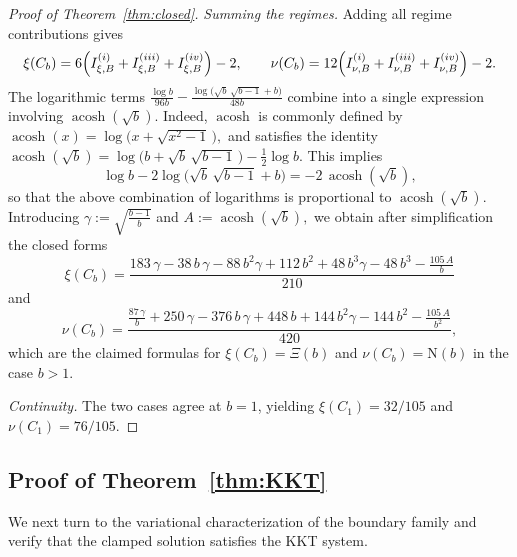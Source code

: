 \documentclass{article}
\DeclareMathOperator{\acosh}{acosh}
\newcommand{\1}{\mathds{1}}
\newcommand{\NN}{\mathrm{N}}
\begin{document}
\begin{proof}[Proof of Theorem~\ref{thm:closed}]
\smallskip
\noindent\emph{Summing the regimes.}
Adding all regime contributions gives
\[
\xi(C_b)
= 6\Bigl(I^{(i)}_{\xi,B}+I^{(iii)}_{\xi,B}+I^{(iv)}_{\xi,B}\Bigr)-2,
\qquad
\nu(C_b)
= 12\Bigl(I^{(i)}_{\nu,B}+I^{(iii)}_{\nu,B}+I^{(iv)}_{\nu,B}\Bigr)-2.
\]
The logarithmic terms
\(
\frac{\log b}{96b}
-\frac{\log\!\bigl(\sqrt b\,\sqrt{b-1}+b\bigr)}{48b}
\)
combine into a single expression involving  \(\acosh(\sqrt b)\).
Indeed, $\acosh$ is commonly defined by
\(
\acosh(x)=\log\!\bigl(x+\sqrt{x^2-1}\,\bigr),
\)
and satisfies the identity
\(
\acosh(\sqrt b)
=\log\!\bigl(b+\sqrt b\,\sqrt{b-1}\,\bigr)-\tfrac12\log b.
\)
This implies
\[
\log b-2\log\!\bigl(\sqrt b\,\sqrt{b-1}+b\bigr)
=-2\,\acosh(\sqrt b),
\]
so that the above combination of logarithms is proportional to \(\acosh(\sqrt b)\).
Introducing
\(
\gamma:=\sqrt{\frac{b-1}{\,b\,}}
\)
and
\(
A:=\acosh(\sqrt b),
\)
we obtain after simplification the closed forms
\[
\xi(C_b)
= \frac{
 183\,\gamma
 -38\,b\,\gamma
 -88\,b^{2}\gamma
 +112\,b^{2}
 +48\,b^{3}\gamma
 -48\,b^{3}
 -\frac{105\,A}{b}
}{210}
\]
and
\[
\nu(C_b)
= \frac{
 \frac{87\,\gamma}{b}
 +250\,\gamma
 -376\,b\,\gamma
 +448\,b
 +144\,b^{2}\gamma
 -144\,b^{2}
 -\frac{105\,A}{b^{2}}
}{420},
\]
which are the claimed formulas for \(\xi(C_b)=\Xi(b)\) and \(\nu(C_b)=\NN(b)\) in the case \(b>1\).

\smallskip
\noindent\emph{Continuity.}
The two cases agree at \(b=1\), yielding \(\xi(C_1)=32/105\) and \(\nu(C_1)=76/105\).
\end{proof}

\subsection{Proof of Theorem~\ref{thm:KKT}}
\label{sec:proofs-kkt}

We next turn to the variational characterization of the boundary family and verify that the clamped solution satisfies the KKT system.
\end{document}
